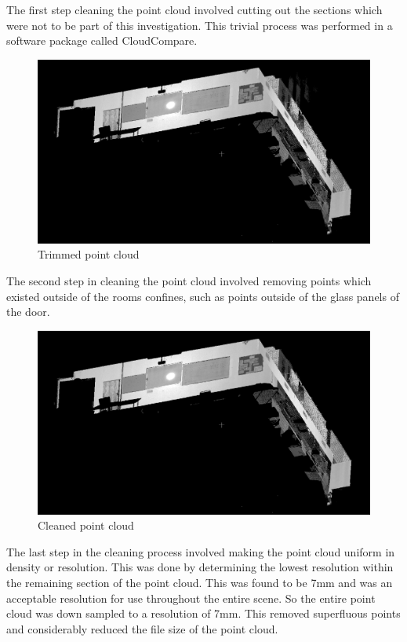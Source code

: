 \documentclass[11pt,a4paper]{report}
\begin{document}
				The first step cleaning the point cloud involved cutting out the sections which were not to be part of this investigation. This trivial process was performed in a software package called CloudCompare.
				
				\begin{figure}[H]
					\centering
					\includegraphics[width=1\textwidth]{trimmed_point_cloud_1}
					\caption{Trimmed point cloud}
				\end{figure}
				
				The second step in cleaning the point cloud involved removing points which existed outside of the rooms confines, such as points outside of the glass panels of the door.
				
				\begin{figure}[H]
					\centering
					\includegraphics[width=1\textwidth]{cleaned_point_cloud_1}
					\caption{Cleaned point cloud}
				\end{figure}
 
				The last step in the cleaning process involved making the point cloud uniform in density or resolution. This was done by determining the lowest resolution within the remaining section of the point cloud. This was found to be 7mm and was an acceptable resolution for use throughout the entire scene. So the entire point cloud was down sampled to a resolution of 7mm. This removed superfluous points and considerably reduced the file size of the point cloud.
				
\end{document}
